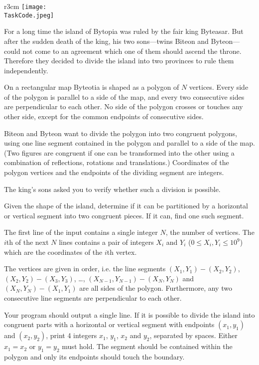 \documentclass{boi2014}
\renewcommand{\TaskCode}{demarcation}
\begin{document}
    \begin{wrapfigure}{r}{3cm}
        \vspace{-24pt}
		\texttt{[image: \\TaskCode.jpeg]}
	\end{wrapfigure}

    For a long time the island of Bytopia was ruled by the fair king
    Byteasar. But after the sudden death
    of the king, his two sons---twins Biteon and Byteon---could
    not come to an agreement which one of them should ascend the throne.
    Therefore they decided to divide the island into two provinces to
    rule them independently.  
 
    On a rectangular map Byteotia is shaped as a polygon of $N$ vertices.  Every
    side of the polygon is parallel to a side of the map, and every two
    consecutive sides are perpendicular to each other. No side of the polygon
    crosses or touches any other side, except for the common endpoints of
    consecutive sides.
    
    Biteon and Byteon want to divide the polygon into two congruent polygons,
    using one line segment contained in the polygon and parallel to a side of
    the map.  (Two figures are congruent if one can be transformed into the
    other using a combination of reflections, rotations and translations.)
    Coordinates of the polygon vertices and the endpoints of the dividing
    segment are integers.  
 
    The king's sons asked you to verify whether such a division is
    possible.

    \Task
    Given the shape of the island, determine if it can be partitioned
    by a horizontal or vertical segment into two congruent pieces. If
    it can, find one such segment.
    
    \Input
    The first line of the input contains a single integer $N$, the number of
    vertices. The $i$th of the next $N$ lines contains a pair of integers $X_i$
    and $Y_i$ ($0 \le X_i, Y_i \le 10^9$) which are the coordinates of the $i$th
    vertex.

    The vertices are given in order, i.e. the line segments $(X_1,Y_1) -
    (X_2,Y_2)$, $(X_2,Y_2) - (X_3,Y_3)$, \ldots, $(X_{N-1},Y_{N-1}) - (X_N,Y_N)$
    and $(X_N,Y_N) - (X_1,Y_1)$ are all sides of the polygon.  Furthermore, any
    two consecutive line segments are perpendicular to each other.

	\Output
	Your program should output a single line. If it is possible to divide the
	island into congruent parts with a horizontal or vertical segment with
	endpoints $(x_1, y_1)$ and $(x_2, y_2)$, print 4 integers $x_1$,
	$y_1$, $x_2$ and $y_2$, separated by spaces.
	Either $x_1 = x_2$ or $y_1 = y_2$ must hold.
    The segment should be contained within the polygon and only its endpoints
    should touch the boundary.
\end{document}
